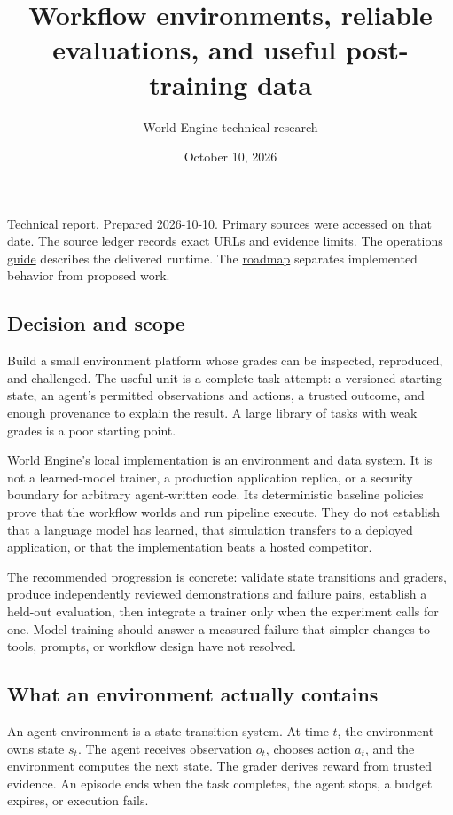 \documentclass[
  11pt,
  letterpaper,
]{article}
\title{Workflow environments, reliable evaluations, and useful
post-training data}
\author{World Engine technical research}
\date{October 10, 2026}
\begin{document}
\maketitle

Technical report. Prepared 2026-10-10. Primary sources were accessed on
that date. The \href{../research/SOURCES.md}{source ledger} records
exact URLs and evidence limits. The \href{../OPERATIONS.md}{operations
guide} describes the delivered runtime. The
\href{../ROADMAP.md}{roadmap} separates implemented behavior from
proposed work.

\subsection{Decision and scope}\label{decision-and-scope}

Build a small environment platform whose grades can be inspected,
reproduced, and challenged. The useful unit is a complete task attempt:
a versioned starting state, an agent's permitted observations and
actions, a trusted outcome, and enough provenance to explain the result.
A large library of tasks with weak grades is a poor starting point.

World Engine's local implementation is an environment and data system.
It is not a learned-model trainer, a production application replica, or
a security boundary for arbitrary agent-written code. Its deterministic
baseline policies prove that the workflow worlds and run pipeline
execute. They do not establish that a language model has learned, that
simulation transfers to a deployed application, or that the
implementation beats a hosted competitor.

The recommended progression is concrete: validate state transitions and
graders, produce independently reviewed demonstrations and failure
pairs, establish a held-out evaluation, then integrate a trainer only
when the experiment calls for one. Model training should answer a
measured failure that simpler changes to tools, prompts, or workflow
design have not resolved.

\subsection{What an environment actually
contains}\label{what-an-environment-actually-contains}

An agent environment is a state transition system. At time \(t\), the
environment owns state \(s_t\). The agent receives observation \(o_t\),
chooses action \(a_t\), and the environment computes the next state. The
grader derives reward from trusted evidence. An episode ends when the
task completes, the agent stops, a budget expires, or execution fails.
\end{document}
